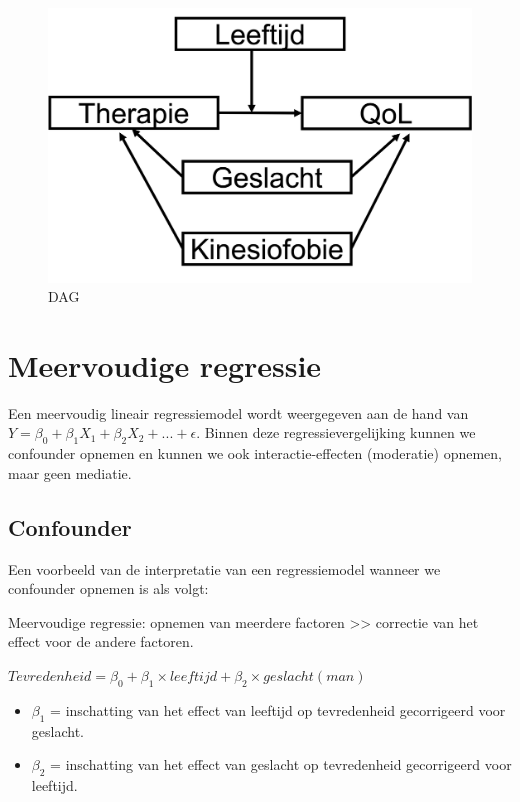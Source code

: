 \documentclass[
]{book}
\providecommand{\tightlist}{%
  \setlength{\itemsep}{0pt}\setlength{\parskip}{0pt}}
\theoremstyle{definition}
\theoremstyle{definition}
\theoremstyle{definition}
\theoremstyle{definition}
\theoremstyle{remark}
\begin{document}
\begin{figure}
\includegraphics[width=0.75\linewidth]{img/dag6} \caption{DAG}\label{fig:dag6}
\end{figure}

\hypertarget{meervoudige-regressie}{%
\section*{Meervoudige regressie}\label{meervoudige-regressie}}


Een meervoudig lineair regressiemodel wordt weergegeven aan de hand van \(Y = \beta_0 + \beta_1X_1 + \beta_2X_2+...+\epsilon\). Binnen deze regressievergelijking kunnen we confounder opnemen en kunnen we ook interactie-effecten (moderatie) opnemen, maar geen mediatie.

\hypertarget{confounder}{%
\subsection*{Confounder}\label{confounder}}


Een voorbeeld van de interpretatie van een regressiemodel wanneer we confounder opnemen is als volgt:

Meervoudige regressie: opnemen van meerdere factoren \textgreater\textgreater{} correctie van het effect voor de andere factoren.

\(Tevredenheid = \beta_0 + \beta_1 \times leeftijd + \beta_2 \times geslacht(man)\)

\begin{itemize}
\tightlist
\item
  \(\beta_1\) = inschatting van het effect van leeftijd op tevredenheid gecorrigeerd voor geslacht.
\item
  \(\beta_2\) = inschatting van het effect van geslacht op tevredenheid gecorrigeerd voor leeftijd.
\end{itemize}
\end{document}
